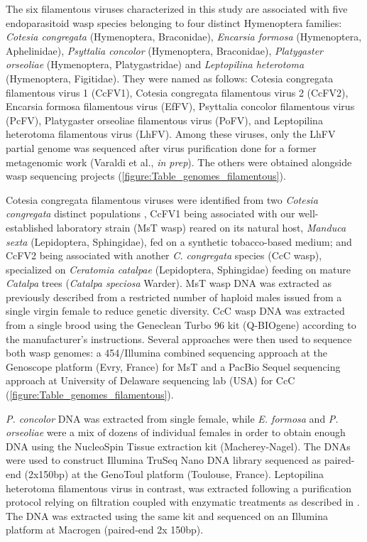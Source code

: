 The six filamentous viruses characterized in this study are associated with five endoparasitoid wasp species belonging to four distinct Hymenoptera families: \textit{Cotesia congregata} (Hymenoptera, Braconidae), \textit{Encarsia formosa} (Hymenoptera, Aphelinidae), \textit{Psyttalia concolor} (Hymenoptera, Braconidae), \textit{Platygaster orseoliae} (Hymenoptera, Platygastridae) and \textit{Leptopilina heterotoma} (Hymenoptera, Figitidae). They were named as follows: Cotesia congregata filamentous virus 1 (CcFV1), Cotesia congregata filamentous virus 2 (CcFV2), Encarsia formosa filamentous virus (EfFV), Psyttalia concolor filamentous virus (PcFV), Platygaster orseoliae filamentous virus (PoFV), and Leptopilina heterotoma filamentous virus (LhFV). Among these viruses, only the LhFV partial genome was sequenced after virus purification done for a former metagenomic work (Varaldi et al., \textit{in prep}). The others were obtained alongside wasp sequencing projects (\figurename{\ref{figure:Table_genomes_filamentous}}). 

Cotesia congregata filamentous viruses were identified from two \textit{Cotesia congregata} distinct populations \citep{bredlau_parasitic_2019}, CcFV1 being associated with our well-established laboratory strain (MsT wasp) reared on its natural host, \textit{Manduca sexta} (Lepidoptera, Sphingidae), fed on a synthetic tobacco-based medium; and CcFV2 being associated with another \textit{C. congregata} species (CcC wasp), specialized on \textit{Ceratomia catalpae} (Lepidoptera, Sphingidae) feeding on mature \textit{Catalpa} trees (\textit{Catalpa speciosa} Warder). MsT wasp DNA was extracted as previously described \citep{gauthier_chromosomal_2021} from a restricted number of haploid males issued from a single virgin female to reduce genetic diversity. CcC wasp DNA was extracted from a single brood using the Geneclean Turbo 96 kit (Q-BIOgene) according to the manufacturer’s instructions. Several approaches were then used to sequence both wasp genomes: a 454/Illumina combined sequencing approach at the Genoscope platform (Evry, France) for MsT \citep{gauthier_chromosomal_2021} and a PacBio Sequel sequencing approach at University of Delaware sequencing lab (USA) for CcC  (\figurename{\ref{figure:Table_genomes_filamentous}}). 

\textit{P. concolor} DNA was extracted from single female, while \textit{E. formosa} and \textit{P. orseoliae} were a mix of dozens of individual females in order to obtain enough DNA using the NucleoSpin Tissue extraction kit (Macherey-Nagel). The DNAs were used to construct Illumina TruSeq Nano DNA library sequenced as paired-end (2x150bp) at the GenoToul platform (Toulouse, France). Leptopilina heterotoma filamentous virus in contrast, was extracted following a purification protocol relying on filtration coupled with enzymatic treatments as described in \citep{lepetit_genome_2017}. The DNA was extracted using the same kit and sequenced on an Illumina platform at Macrogen (paired-end 2x 150bp).  

